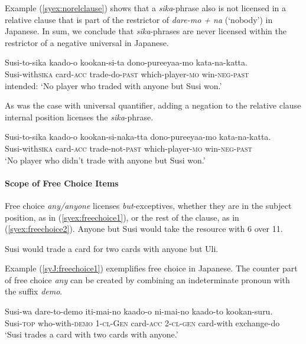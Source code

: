 \documentclass[output=paper,colorlinks,citecolor=brown,
]{langscibook}
\def\M#1{\textsc{#1}}
\begin{document}
Example (\ref{syex:norelclause}) shows that a \emph{sika}-phrase also is not licensed in a relative clause that is part of the restrictor of \emph{dare-mo + na} (`nobody') in Japanese.  In sum, we conclude that \emph{sika}-phrases are never licensed within the restrictor of a negative universal in Japanese.

\ea \label{syex:norelclause}
\gll *Susi-to-sika kaado-o kookan-si-ta dono-pureeyaa-mo kata-na-katta.\\
Susi-with\M{sika} card-\M{acc} trade-do-\M{past} which-player-\M{mo} win-\M{neg}-\M{past}\\
\glt intended: `No player who traded with anyone but Susi won.'
\z

As was the case with universal quantifier, adding a negation to the relative clause internal position licenses the \emph{sika}-phrase.

\ea 
\gll Susi-to-sika kaado-o kookan-si-naka-tta dono-pureeyaa-mo kata-na-katta.\\
Susi-with\M{sika} card-\M{acc} trade-not-\M{past} which-player-\M{mo} win-\M{neg}-\M{past}\\
\glt `No player who didn't trade with anyone but Susi won.'
\z


%
        
\paragraph{Scope of Free Choice Items}
Free choice \emph{any/anyone} licenses \emph{but}-exceptives, whether they are in the subject position, as in (\ref{syex:freechoice1}), or the rest of the clause, as in (\ref{syex:freechoice2}). 
\ea \label{syex:freechoice1}
Anyone but Susi would take the resource with 6 over 11.\z

\ea \label{syex:freechoice2}
Susi would trade a card for two cards with anyone but Uli.\z

Example (\ref{syJ:freechoice1}) exemplifies free choice in Japanese. The counter part of free choice \emph{any} can be created by combining an indeterminate pronoun with the suffix \emph{demo}. 

\ea \label{syJ:freechoice1}
\gll Susi-wa dare-to-demo iti-mai-no kaado-o ni-mai-no kaado-to kookan-suru.\\
Susi-\M{top} who-with-\M{demo} 1-\M{cl}-\M{Gen} card-\M{acc} 2-\M{cl}-\M{gen} card-with exchange-do\\
\glt `Susi trades a card with two cards with anyone.'\z
\end{document}
